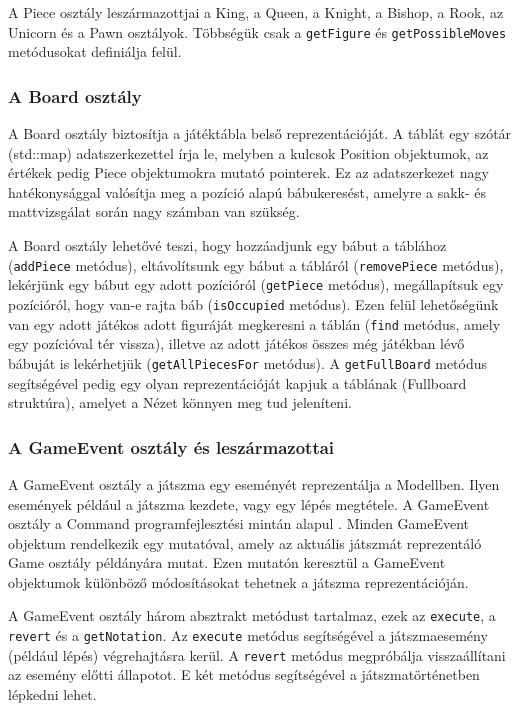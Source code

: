 \documentclass[12pt, twoside]{report}
\begin{document}
A Piece osztály leszármazottjai a King, a Queen, a Knight, a Bishop, a Rook, az Unicorn és a Pawn osztályok. Többségük csak a {\tt getFigure} és {\tt getPossibleMoves} metódusokat definiálja felül.

\subsubsection{A Board osztály}

A Board osztály biztosítja a játéktábla belső reprezentációját. A táblát egy szótár (std::map) adatszerkezettel írja le, melyben a kulcsok Position objektumok, az értékek pedig Piece objektumokra mutató pointerek. Ez az adatszerkezet nagy hatékonysággal valósítja meg a pozíció alapú bábukeresést, amelyre a sakk- és mattvizsgálat során nagy számban van szükség.

A Board osztály lehetővé teszi, hogy hozzáadjunk egy bábut a táblához ({\tt addPiece} metódus), eltávolítsunk egy bábut a tábláról ({\tt removePiece} metódus), lekérjünk egy bábut egy adott pozícióról ({\tt getPiece} metódus), megállapítsuk egy pozícióról, hogy van-e rajta báb ({\tt isOccupied} metódus). Ezen felül lehetőségünk van egy adott játékos adott figuráját megkeresni a táblán ({\tt find} metódus, amely egy pozícióval tér vissza), illetve az adott játékos összes még játékban lévő bábuját is lekérhetjük ({\tt getAllPiecesFor} metódus). A {\tt getFullBoard} metódus segítségével pedig egy olyan reprezentációját kapjuk a táblának (Fullboard struktúra), amelyet a Nézet könnyen meg tud jeleníteni.

\subsubsection{A GameEvent osztály és leszármazottai}

A GameEvent osztály a játszma egy eseményét reprezentálja a Modellben. Ilyen események például a játszma kezdete, vagy egy lépés megtétele. A GameEvent osztály a Command programfejlesztési mintán alapul \cite{designpatterns}. Minden GameEvent objektum rendelkezik egy mutatóval, amely az aktuális játszmát reprezentáló Game osztály példányára mutat. Ezen mutatón keresztül a GameEvent objektumok különböző módosításokat tehetnek a játszma reprezentációján.

A GameEvent osztály három absztrakt metódust tartalmaz, ezek az {\tt execute}, a {\tt revert} és a {\tt getNotation}. Az {\tt execute} metódus segítségével a játszmaesemény (például lépés) végrehajtásra kerül. A {\tt revert} metódus megpróbálja visszaállítani az esemény előtti állapotot. E két metódus segítségével a játsz\-ma\-tör\-té\-net\-ben lépkedni lehet.
\end{document}
